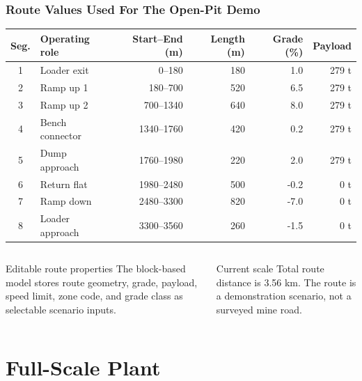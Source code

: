 \documentclass[aspectratio=169]{beamer}
\begin{document}
\begin{frame}
\frametitle{Route Values Used For The Open-Pit Demo}

\centering
\scriptsize
\begin{tabular}{clrrrr}
\toprule
Seg. & Operating role & Start--End (m) & Length (m) & Grade (\%) & Payload \\
\midrule
1 & Loader exit      & 0--180     & 180 &  1.0 & 279 t \\
2 & Ramp up 1        & 180--700   & 520 &  6.5 & 279 t \\
3 & Ramp up 2        & 700--1340  & 640 &  8.0 & 279 t \\
4 & Bench connector  & 1340--1760 & 420 &  0.2 & 279 t \\
5 & Dump approach    & 1760--1980 & 220 &  2.0 & 279 t \\
6 & Return flat      & 1980--2480 & 500 & -0.2 & 0 t \\
7 & Ramp down        & 2480--3300 & 820 & -7.0 & 0 t \\
8 & Loader approach  & 3300--3560 & 260 & -1.5 & 0 t \\
\bottomrule
\end{tabular}

\vspace{0.55cm}
\begin{columns}[T,totalwidth=0.9\textwidth]
\begin{block}{Editable route properties}
\small
The block-based model stores route geometry, grade, payload, speed limit, zone code, and grade class as selectable scenario inputs.
\end{block}
\begin{block}{Current scale}
\small
Total route distance is 3.56 km. The route is a demonstration scenario, not a surveyed mine road.
\end{block}
\end{columns}

\end{frame}

\section{Full-Scale Plant}
\end{document}
